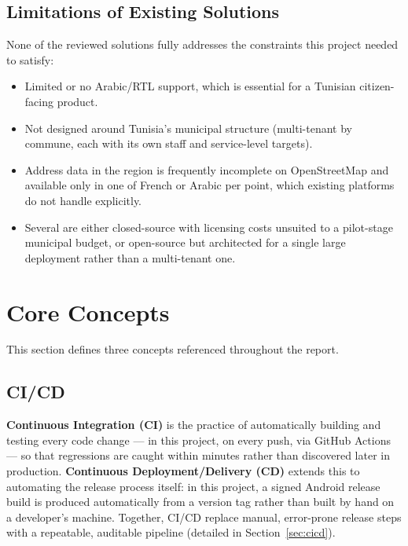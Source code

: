 \subsection{Limitations of Existing Solutions}

None of the reviewed solutions fully addresses the constraints this project needed to satisfy:

\begin{itemize}[leftmargin=*]
  \item Limited or no Arabic/RTL support, which is essential for a Tunisian citizen-facing product.
  \item Not designed around Tunisia's municipal structure (multi-tenant by commune, each with its own staff and service-level targets).
  \item Address data in the region is frequently incomplete on OpenStreetMap and available only in one of French or Arabic per point, which existing platforms do not handle explicitly.
  \item Several are either closed-source with licensing costs unsuited to a pilot-stage municipal budget, or open-source but architected for a single large deployment rather than a multi-tenant one.

\end{itemize}

\section{Core Concepts}

This section defines three concepts referenced throughout the report.

\subsection{CI/CD}

\textbf{Continuous Integration (CI)} is the practice of automatically building and testing every code change --- in this project, on every push, via GitHub Actions --- so that regressions are caught within minutes rather than discovered later in production. \textbf{Continuous Deployment/Delivery (CD)} extends this to automating the release process itself: in this project, a signed Android release build is produced automatically from a version tag rather than built by hand on a developer's machine. Together, CI/CD replace manual, error-prone release steps with a repeatable, auditable pipeline (detailed in Section~\ref{sec:cicd}).

